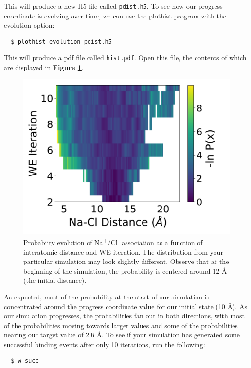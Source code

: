 \pagebreak
This will produce a new H5 file called \verb|pdist.h5|. 
To see how our progress coordinate is evolving over time, we can use the plothist program with the evolution option:

\begin{verbatim}
  $ plothist evolution pdist.h5
\end{verbatim}

This will produce a pdf file called \verb|hist.pdf|. 
Open this file, the contents of which are displayed in \textbf{Figure \ref{fig:nacl-hist}}. 

\begin{figure}
\centering
\includegraphics[width=\linewidth]{figures/Figure4-2.pdf}
\caption{Probabiity evolution of Na\textsuperscript{+}/Cl\textsuperscript{-} association as a function of interatomic distance and WE iteration. 
The distribution from your particular simulation may look slightly different. 
Observe that at the beginning of the simulation, the probability is centered around 12 \AA{} (the initial distance).}
\label{fig:nacl-hist}
\end{figure}

As expected, most of the probability at the start of our simulation is concentrated around the progress coordinate value for our initial state (10 \AA). 
As our simulation progresses, the probabilities fan out in both directions, with most of the probabilities moving towards larger values and some of the probabilities nearing our target value of 2.6 \AA. 
To see if your simulation has generated some successful binding events after only 10 iterations, run the following:
\begin{verbatim}
  $ w_succ
\end{verbatim}
 
